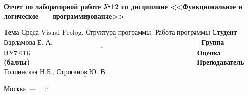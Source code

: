 \documentclass[12pt]{report}
\begin{document}
\begin{titlepage}
		\begin{center}
			\noindent\begin{minipage}{1.1\textwidth}\centering
				\Large\textbf{Отчет по лабораторной работе №12}\newline
				\textbf{по дисциплине <<Функциональное и логическое}\newline
				\textbf{~~~программирование>>}\newline\newline
			\end{minipage}
		\end{center}
		
		\noindent\textbf{Тема} $\underline{\text{Среда Visual Prolog. Структура программы. Работа программы}}$\newline\newline
		\noindent\textbf{Студент} $\underline{\text{Варламова Е. А.~~~~~~~~~~~~~~~~~~~~~~~~~~~~~~~~~~~~~~~~~~~~~~~~~~~~~~~~~~~~~~~~~}}$\newline\newline
		\noindent\textbf{Группа} $\underline{\text{ИУ7-61Б~~~~~~~~~~~~~~~~~~~~~~~~~~~~~~~~~~~~~~~~~~~~~~~~~~~~~~~~~~~~~~~~~~~~~~~~~}}$\newline\newline
		\noindent\textbf{Оценка (баллы)} $\underline{\text{~~~~~~~~~~~~~~~~~~~~~~~~~~~~~~~~~~~~~~~~~~~~~~~~~~~~~~~~~~~~~~~~~~~~~~~~}}$\newline\newline
		\noindent\textbf{Преподаватель} $\underline{\text{Толпинская Н.Б., Строганов Ю. В.~~~~~~~~~~~~~~~~~~~~~~~~~~}}$\newline\newline\newline
		
		\begin{center}
			\vfill
			Москва~---~\the\year
			~г.
		\end{center}
	\end{titlepage}
\end{document}
